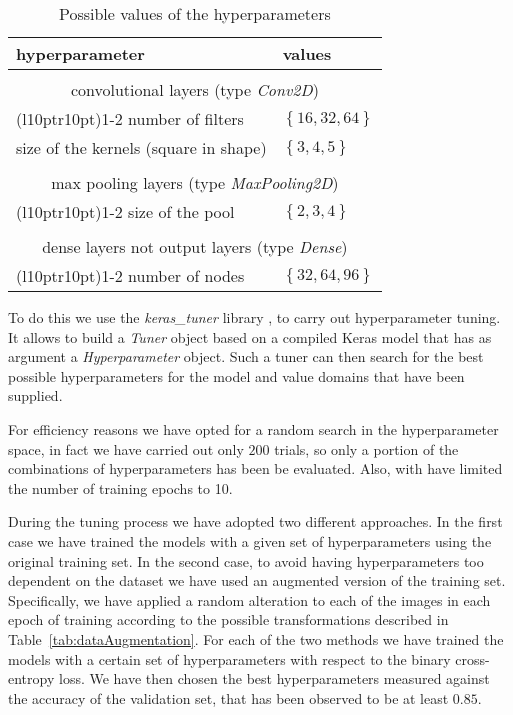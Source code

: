 \begin{table}[h]
    \centering
    \begin{tabular}{ll}
        \textbf{hyperparameter} & \textbf{values}\\
        \midrule
        \\
        \multicolumn{2}{c}{convolutional layers (type \textit{Conv2D})} \\
        \cmidrule(l{10pt}r{10pt}){1-2} 
        number of filters & $\left\{16, 32, 64\right\}$ \\
        size of the kernels (square in shape) & $\left\{3, 4, 5\right\}$\\
        \\
        \multicolumn{2}{c}{max pooling layers (type \textit{MaxPooling2D})
        } \\
        \cmidrule(l{10pt}r{10pt}){1-2} 
        size of the pool & $\left\{2, 3, 4\right\}$\\
        \\
        \multicolumn{2}{c}{dense layers not output layers (type \textit{Dense})} \\
        \cmidrule(l{10pt}r{10pt}){1-2}
        number of nodes & $\left\{32, 64, 96\right\}$
    \end{tabular}
    \caption{Possible values of the hyperparameters}
    \label{tab:hyperparameters}
\end{table}

   
To do this we use the \textit{keras\_tuner} library \cite{omalley2019kerastuner}, to carry out hyperparameter tuning. It allows to build a \textit{Tuner} object based on a compiled Keras model that has as argument a \textit{Hyperparameter} object. Such a tuner can then search for the best possible hyperparameters for the model and value domains that have been supplied. 

For efficiency reasons we have opted for a random search in the hyperparameter space, in fact we have carried out only $200$ trials, so only a portion of the combinations of hyperparameters has been be evaluated. Also, with have limited the number of training epochs to 10.

During the tuning process we have adopted two different approaches. In the first case we have trained the models with a given set of hyperparameters using the original training set. In the second case, to avoid having hyperparameters too dependent on the dataset we have used an augmented version of the training set. Specifically, we have applied a random alteration to each of the images in each epoch of training according to the possible transformations described in Table~\ref{tab:dataAugmentation}. For each of the two methods we have trained the models with a certain set of hyperparameters with respect to the binary cross-entropy loss. We have then chosen the best hyperparameters measured against the accuracy of the validation set, that has been observed to be at least $0.85$. 

